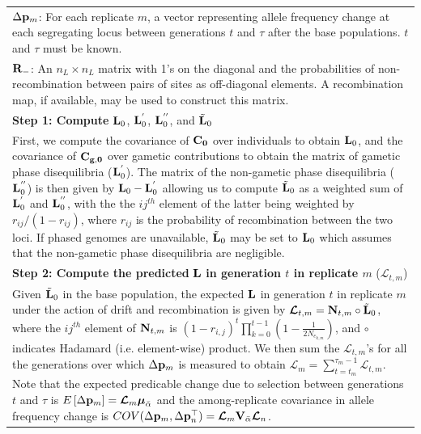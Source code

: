 \documentclass[12pt]{article}
\begin{document}
\begin{bibunit}
\begin{longtable}{|p{15cm}|}
$\Delta {\bf p}_{m}$: For each replicate $m$, a vector representing allele frequency change at each segregating locus between generations $t$ and $\tau$ after the base populations. $t$ and $\tau$ must be known. \\
${\bf R}_{-}$: An $n_L \times n_L$ matrix with 1's on the diagonal and the probabilities of non-recombination between pairs of sites as off-diagonal elements. A recombination map, if available, may be used to construct this matrix.\\
\hline
\textbf{Step 1: Compute} ${\bf L}_0$, ${\bf L}_0^{'}$, ${\bf L}_0^{''}$, and $\tilde{\bf L}_{0}$  \\
First, we compute the covariance of $\bf{C_0}$ over individuals to obtain ${\bf L}_0$, and the covariance of $\bf{C_{g,0}}$ over gametic contributions to obtain the matrix of gametic phase disequilibria (${\bf L}_0^{'}$).  The matrix of the non-gametic phase disequilibria (${\bf L}_0^{''}$) is then given by ${\bf L}_0 - {\bf L}_0^{'}$ allowing us to compute $\tilde{\bf L}_{0}$ as a weighted sum of ${\bf L}^{'}_{0}$ and ${\bf L}_0^{''}$, with the the $ij^{th}$ element of the latter being weighted by $r_{ij}/(1-r_{ij})$, where $r_{ij}$ is the probability of recombination  between the two loci. If phased genomes are unavailable, $\tilde{\bf L}_{0}$ may be set to ${\bf L}_0$ which assumes that the non-gametic phase disequilibria are negligible. \\
\hline
\textbf{Step 2: Compute the predicted} ${\bf L}$ \textbf{in generation $t$ in replicate $m$} ($\boldsymbol{\mathcal{L}}_{t,m}$) \\
Given $\tilde{\bf L}_{0}$ in the base population, the expected ${\bf L}$ in generation $t$ in replicate $m$ under the action of drift and recombination is given by $\boldsymbol{\mathcal{L}}_{t,m} = {\bf N}_{t,m}\circ\tilde{\bf L}_0$, where the $ij^{th}$ element of ${\bf N}_{t,m}$ is $(1-r_{i,j})^{t}\prod_{k=0}^{t-1}(1-\frac{1}{2N_{e_{k,m}}})$, and  $\circ$ indicates Hadamard (i.e. element-wise) product. We then sum the $\boldsymbol{\mathcal{L}}_{t,m}$'s for all the generations over which $\Delta {\bf p}_{m}$ is measured to obtain $\boldsymbol{\mathcal{L}}_m=\sum_{t=t_m}^{\tau_m-1}\boldsymbol{\mathcal{L}}_{t,m}$. Note that the expected predicable change due to selection between generations $t$ and $\tau$ is $E\left[\Delta {\bf p}_m\right] = \boldsymbol{\mathcal{L}}_m\boldsymbol{\mu}_{\bar{\alpha}}$ and the among-replicate covariance in allele frequency change is $COV(\Delta {\bf p}_m, \Delta {\bf p}_n^{\top})=\boldsymbol{\mathcal{L}}_m{\bf V}_{\bar{\alpha}}\boldsymbol{\mathcal{L}}_n$. \\

\end{longtable}
\end{bibunit}
\end{document}
